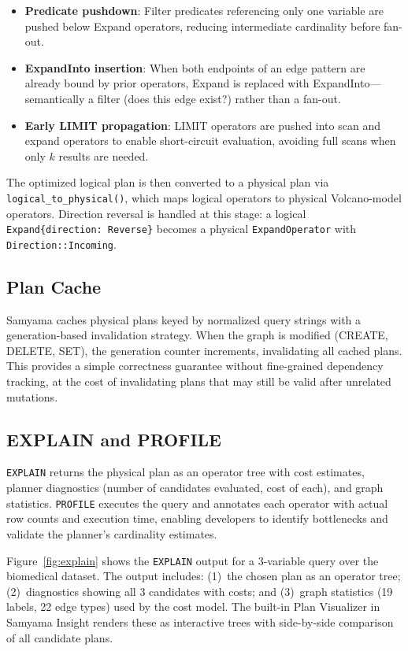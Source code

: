 \documentclass[sigconf, nonacm]{acmart}
\begin{document}
\begin{itemize}[leftmargin=*]
  \item \textbf{Predicate pushdown}: Filter predicates referencing only one variable are pushed below Expand operators, reducing intermediate cardinality before fan-out.
  \item \textbf{ExpandInto insertion}: When both endpoints of an edge pattern are already bound by prior operators, Expand is replaced with ExpandInto---semantically a filter (does this edge exist?) rather than a fan-out.
  \item \textbf{Early LIMIT propagation}: LIMIT operators are pushed into scan and expand operators to enable short-circuit evaluation, avoiding full scans when only $k$ results are needed.
\end{itemize}

\noindent
The optimized logical plan is then converted to a physical plan via \texttt{logical\_to\_physical()}, which maps logical operators to physical Volcano-model operators.
Direction reversal is handled at this stage: a logical \texttt{Expand\{direction: Reverse\}} becomes a physical \texttt{ExpandOperator} with \texttt{Direction::Incoming}.

\subsection{Plan Cache}

Samyama caches physical plans keyed by normalized query strings with a generation-based invalidation strategy.
When the graph is modified (CREATE, DELETE, SET), the generation counter increments, invalidating all cached plans.
This provides a simple correctness guarantee without fine-grained dependency tracking, at the cost of invalidating plans that may still be valid after unrelated mutations.

\subsection{EXPLAIN and PROFILE}

\texttt{EXPLAIN} returns the physical plan as an operator tree with cost estimates, planner diagnostics (number of candidates evaluated, cost of each), and graph statistics.
\texttt{PROFILE} executes the query and annotates each operator with actual row counts and execution time, enabling developers to identify bottlenecks and validate the planner's cardinality estimates.

Figure~\ref{fig:explain} shows the \texttt{EXPLAIN} output for a 3-variable query over the biomedical dataset.
The output includes: (1)~the chosen plan as an operator tree; (2)~diagnostics showing all 3 candidates with costs; and (3)~graph statistics (19 labels, 22 edge types) used by the cost model.
The built-in Plan Visualizer in Samyama Insight renders these as interactive trees with side-by-side comparison of all candidate plans.
\end{document}
